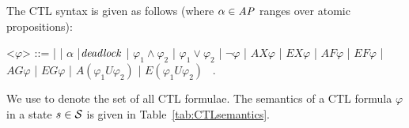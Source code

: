 \documentclass{article}
\begin{document}
The CTL syntax is given as follows (where $\alpha \in \mathit{AP}$ ranges over atomic propositions):
\newcommand{\indalt}[1][2]{\\\hspace*{1pt}\textbar\hspace*{3.5pt}}
\begin{grammar}
    \let\syntleft\relax
    \let\syntright\relax

    <$\varphi$> ::= \true | \false | $\alpha$ |$\mathit{deadlock}$ | $\varphi_{1} \land \varphi_{2}$ | $\varphi_{1} \lor \varphi_{2}$ | $ \neg\varphi$ 
| $\mathit{AX}\varphi$ | $\mathit{EX}\varphi$ | $\mathit{AF}\varphi$ | $\mathit{EF}\varphi$ | $\mathit{AG}\varphi$ | $\mathit{EG}\varphi$ | $\mathit{A}(\varphi_1\mathit{U}\varphi_2)$ | $\mathit{E}(\varphi_1\mathit{U}\varphi_2)$ \ .
\end{grammar}
We use \ctlformulas to denote the set of all CTL formulae.
The semantics of a CTL formula $\varphi$ in a state $s \in \mathcal{S}$ 
is given in Table~\ref{tab:CTLsemantics}. 
\end{document}
